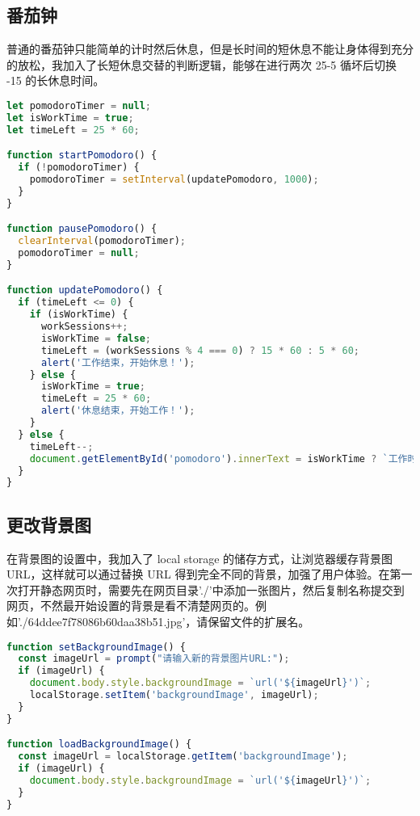 \documentclass{hfutreport}
\begin{document}
\subsection{番茄钟}

普通的番茄钟只能简单的计时然后休息，但是长时间的短休息不能让身体得到充分的放松，我加入了长短休息交替的判断逻辑，能够在进行两次 25-5 循坏后切换 -15 的长休息时间。

\begin{lstlisting}[language=javascript]
let pomodoroTimer = null;
let isWorkTime = true;
let timeLeft = 25 * 60;

function startPomodoro() {
  if (!pomodoroTimer) {
    pomodoroTimer = setInterval(updatePomodoro, 1000);
  }
}

function pausePomodoro() {
  clearInterval(pomodoroTimer);
  pomodoroTimer = null;
}

function updatePomodoro() {
  if (timeLeft <= 0) {
    if (isWorkTime) {
      workSessions++;
      isWorkTime = false;
      timeLeft = (workSessions % 4 === 0) ? 15 * 60 : 5 * 60;
      alert('工作结束，开始休息！');
    } else {
      isWorkTime = true;
      timeLeft = 25 * 60;
      alert('休息结束，开始工作！');
    }
  } else {
    timeLeft--;
    document.getElementById('pomodoro').innerText = isWorkTime ? `工作时间: ${Math.floor(timeLeft / 60)}:${(timeLeft % 60).toString().padStart(2, '0')}` : `休息时间: ${Math.floor(timeLeft / 60)}:${(timeLeft % 60).toString().padStart(2, '0')}`;
  }
}
\end{lstlisting}

\subsection{更改背景图}

在背景图的设置中，我加入了 local storage 的储存方式，让浏览器缓存背景图 URL，这样就可以通过替换 URL 得到完全不同的背景，加强了用户体验。在第一次打开静态网页时，需要先在网页目录'./'中添加一张图片，然后复制名称提交到网页，不然最开始设置的背景是看不清楚网页的。例如'./64ddee7f78086b60daa38b51.jpg'，请保留文件的扩展名。

\begin{lstlisting}[language=javascript]
function setBackgroundImage() {
  const imageUrl = prompt("请输入新的背景图片URL:");
  if (imageUrl) {
    document.body.style.backgroundImage = `url('${imageUrl}')`;
    localStorage.setItem('backgroundImage', imageUrl);
  }
}

function loadBackgroundImage() {
  const imageUrl = localStorage.getItem('backgroundImage');
  if (imageUrl) {
    document.body.style.backgroundImage = `url('${imageUrl}')`;
  }
}
\end{lstlisting}
\end{document}
